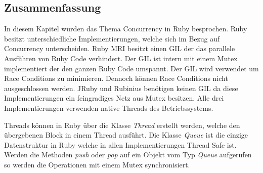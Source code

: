\subsection{Zusammenfassung}
In diesem Kapitel wurden das Thema Concurrency in Ruby besprochen. Ruby besitzt unterschiedliche Implementierungen, welche sich im Bezug auf Concurrency unterscheiden. Ruby MRI besitzt einen GIL der das parallele Ausführen von Ruby Code verhindert. Der GIL ist intern mit einem Mutex implementiert der den ganzen Ruby Code umspannt. Der GIL wird verwendet um Race Conditions zu minimieren. Dennoch können Race Conditions nicht ausgeschlossen werden. JRuby und Rubinius benötigen keinen GIL da diese Implementierungen ein feingradiges Netz aus Mutex besitzen. Alle drei Implementierungen verwenden native Threads des Betriebssystems. 

Threads können in Ruby über die Klasse \emph{Thread} erstellt werden, welche den übergebenen Block in einem Thread ausführt. Die Klasse \emph{Queue} ist die einzige Datenstruktur in Ruby welche in allen Implementierungen Thread Safe ist. Werden die Methoden \emph{push} oder \emph{pop} auf ein Objekt vom Typ \emph{Queue} aufgerufen so werden die Operationen mit einem Mutex synchronisiert.